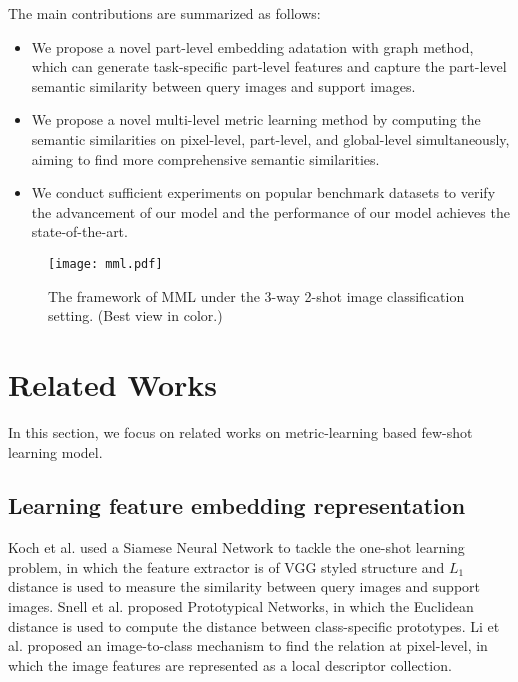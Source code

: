 \documentclass{article}
\begin{document}
The main contributions are summarized as follows: 
\begin{itemize}
	\setlength{\itemsep}{0pt}
	\setlength{\parsep}{0pt}
	\setlength{\parskip}{0pt}
	\item We propose a novel part-level embedding adatation with graph method, which can generate task-specific part-level features and capture the part-level semantic similarity between query images and support images. 
	\item We propose a novel multi-level metric learning method by computing the semantic similarities on pixel-level, part-level, and global-level simultaneously, aiming to find more comprehensive semantic similarities. 
	\item We conduct sufficient experiments on popular benchmark datasets to verify the advancement of our model and the performance of our model achieves the state-of-the-art.
\end{itemize}
\begin{figure*}[t]
	\centering
	\texttt{[image: mml.pdf]}
	\caption{The framework of MML under the 3-way 2-shot image classification setting. (Best view in color.)}
	\label{mml_architecture}
\end{figure*}


\section{Related Works}
In this section, we focus on related works on metric-learning based few-shot learning model.

\subsection{Learning feature embedding representation}
Koch et al. \cite{koch2015siamese} used a Siamese Neural Network to tackle the one-shot learning problem, in which the feature extractor is of VGG styled structure and $L_1$ distance is used to measure the similarity between query images and support images.
Snell et al. \cite{snell2017prototypical} proposed Prototypical Networks, in which the Euclidean distance is used to compute the distance between class-specific prototypes. 
Li et al. \cite{li2019revisiting} proposed an image-to-class mechanism to find the relation at pixel-level, in which the image features are represented as a local descriptor collection.
\end{document}
